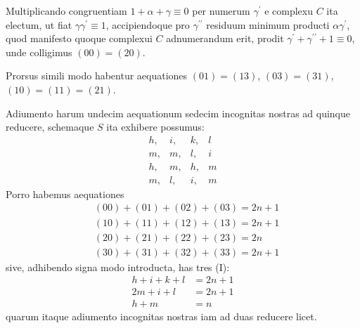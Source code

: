 \documentclass[twoside,12pt]{memoir}
\begin{document}
Multiplicando congruentiam \(1+\alpha+\gamma \equiv 0\) per numerum \(\gamma^{\prime}\) e complexu \(C\) ita electum, ut fiat \(\gamma \gamma^{\prime} \equiv 1\), accipiendoque pro \(\gamma^{\prime \prime}\) residuum minimum producti \(\alpha \gamma^{\prime}\), quod manifesto quoque complexui \(C\) adnumerandum erit, prodit \(\gamma^{\prime}+\gamma^{\prime \prime}+1 \equiv 0\), unde colligimus \((00)=(20)\).
 
Prorsus simili modo habentur aequationes \((01)=(13)\), \((03)=(31)\), \((10)=(11)=(21)\).

Adiumento harum undecim aequationum sedecim incognitas nostras ad quinque reducere, schemaque \(S\) ita exhibere possumus:
\[\begin{array}{llll}
h,&  i,& k,& l \\
m,& m,& l,& i \\
h,& m,& h,& m \\
m,& l,&  i,&  m
\end{array}\]\pagebreak%
Porro habemus aequationes
\[\begin{aligned}
& (00)+(01)+(02)+(03)=2 n+1 \\
& (10)+(11)+(12)+(13)=2 n+1 \\
& (20)+(21)+(22)+(23)=2 n \\
& (30)+(31)+(32)+(33)=2 n+1
\end{aligned}\]
sive, adhibendo signa modo introducta, has tres (I):
\[\begin{aligned}
h+i+k+l & =2 n+1 \\
2 m+i+l & =2 n+1 \\
h+m & =n
\end{aligned}\]
quarum itaque adiumento incognitas nostras iam ad duas reducere licet.
\end{document}
